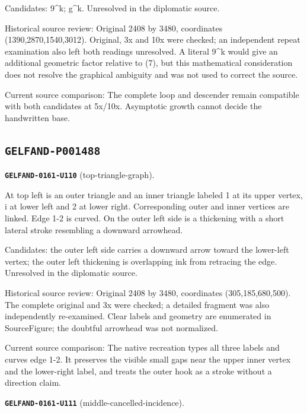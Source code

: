 Candidates: 9\textasciicircum{}k; g\textasciicircum{}k. Unresolved in the diplomatic source.\par
Historical source review: Original 2408 by 3480, coordinates (1390,2870,1540,3012). Original, 3x and 10x were checked; an independent repeat examination also left both readings unresolved. A literal 9\textasciicircum{}k would give an additional geometric factor relative to (7), but this mathematical consideration does not resolve the graphical ambiguity and was not used to correct the source.\par
Current source comparison: The complete loop and descender remain compatible with both candidates at 5x/10x. Asymptotic growth cannot decide the handwritten base.\par\medskip
\subsection*{\texttt{GELFAND-P001488}}
\par\noindent\leavevmode{}\label{GELFAND-0161-U110}\label{GELFAND-P001488:top-triangle-graph}\textbf{\texttt{GELFAND-0161-U110}} (top-triangle-graph).\nopagebreak[4]\par
At top left is an outer triangle and an inner triangle labeled 1 at its upper vertex, i at lower left and 2 at lower right. Corresponding outer and inner vertices are linked. Edge 1-2 is curved. On the outer left side is a thickening with a short lateral stroke resembling a downward arrowhead.\par
Candidates: the outer left side carries a downward arrow toward the lower-left vertex; the outer left thickening is overlapping ink from retracing the edge. Unresolved in the diplomatic source.\par
Historical source review: Original 2408 by 3480, coordinates (305,185,680,500). The complete original and 3x were checked; a detailed fragment was also independently re-examined. Clear labels and geometry are enumerated in SourceFigure; the doubtful arrowhead was not normalized.\par
Current source comparison: The native recreation types all three labels and curves edge 1-2. It preserves the visible small gaps near the upper inner vertex and the lower-right label, and treats the outer hook as a stroke without a direction claim.\par\medskip
\par\noindent\leavevmode{}\label{GELFAND-0161-U111}\label{GELFAND-P001488:middle-cancelled-incidence}\textbf{\texttt{GELFAND-0161-U111}} (middle-cancelled-incidence).\nopagebreak[4]\par
